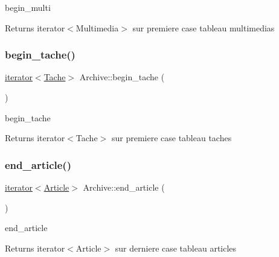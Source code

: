 begin\+\_\+multi 

\begin{DoxyReturn}{Returns}
iterator$<$\+Multimedia$>$ sur premiere case tableau multimedias 
\end{DoxyReturn}
\mbox{\label{class_archive_aaca2e89ecc8bb65a69640091e64ab5b1}} 
\subsubsection{\texorpdfstring{begin\+\_\+tache()}{begin\_tache()}}
{\footnotesize\ttfamily \hyperlink{class_archive_1_1iterator}{iterator}$<$\hyperlink{class_tache}{Tache}$>$ Archive\+::begin\+\_\+tache (\begin{DoxyParamCaption}{ }\end{DoxyParamCaption})\hspace{0.3cm}{\ttfamily [inline]}}



begin\+\_\+tache 

\begin{DoxyReturn}{Returns}
iterator$<$\+Tache$>$ sur premiere case tableau taches 
\end{DoxyReturn}
\mbox{\label{class_archive_a06f4dca9905c8384f34005850a762b7d}} 
\subsubsection{\texorpdfstring{end\+\_\+article()}{end\_article()}}
{\footnotesize\ttfamily \hyperlink{class_archive_1_1iterator}{iterator}$<$\hyperlink{class_article}{Article}$>$ Archive\+::end\+\_\+article (\begin{DoxyParamCaption}{ }\end{DoxyParamCaption})\hspace{0.3cm}{\ttfamily [inline]}}



end\+\_\+article 

\begin{DoxyReturn}{Returns}
iterator$<$\+Article$>$ sur derniere case tableau articles 
\end{DoxyReturn}
\mbox{\label{class_archive_a0bf5d8c15ce9a7494f9e3e66711b76e5}} 
